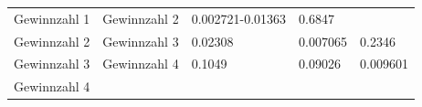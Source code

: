 \documentclass[ngerman,]{article}
\begin{document}
\begin{longtable}[]{@{}lllll@{}}
\midrule
\endhead
\begin{minipage}[t]{0.23\columnwidth}\raggedright\strut
Gewinnzahl 1\strut
\end{minipage} & \begin{minipage}[t]{0.19\columnwidth}\raggedright\strut
Gewinnzahl 2\strut
\end{minipage} & \begin{minipage}[t]{0.19\columnwidth}\raggedright\strut
0.002721-0.01363\strut
\end{minipage} & \begin{minipage}[t]{0.19\columnwidth}\raggedright\strut
0.6847\strut
\end{minipage}\tabularnewline
\begin{minipage}[t]{0.23\columnwidth}\raggedright\strut
Gewinnzahl 2\strut
\end{minipage} & \begin{minipage}[t]{0.19\columnwidth}\raggedright\strut
Gewinnzahl 3\strut
\end{minipage} & \begin{minipage}[t]{0.19\columnwidth}\raggedright\strut
0.02308\strut
\end{minipage} & \begin{minipage}[t]{0.19\columnwidth}\raggedright\strut
0.007065\strut
\end{minipage} & \begin{minipage}[t]{0.07\columnwidth}\raggedright\strut
0.2346\strut
\end{minipage}\tabularnewline
\begin{minipage}[t]{0.23\columnwidth}\raggedright\strut
Gewinnzahl 3\strut
\end{minipage} & \begin{minipage}[t]{0.19\columnwidth}\raggedright\strut
Gewinnzahl 4\strut
\end{minipage} & \begin{minipage}[t]{0.19\columnwidth}\raggedright\strut
0.1049\strut
\end{minipage} & \begin{minipage}[t]{0.19\columnwidth}\raggedright\strut
0.09026\strut
\end{minipage} & \begin{minipage}[t]{0.07\columnwidth}\raggedright\strut
0.009601\strut
\end{minipage}\tabularnewline
\begin{minipage}[t]{0.23\columnwidth}\raggedright\strut
Gewinnzahl 4\strut
\end{minipage} & \begin{minipage}[t]{0.19\columnwidth}\raggedright\strut

\end{minipage}
\end{longtable}
\end{document}
